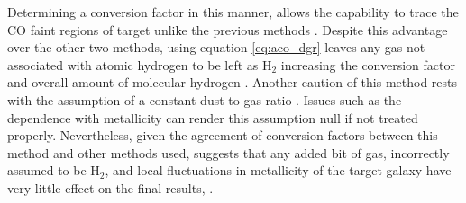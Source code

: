 Determining a conversion factor in this manner, allows the capability to trace the CO faint regions of target unlike the previous methods \citep{israel1997}.  Despite this advantage over the other two methods, using equation \ref{eq:aco_dgr} leaves any gas not associated with atomic hydrogen to be left as H$_2$ increasing the conversion factor and overall amount of molecular hydrogen \citep{bolatto2013}.  Another caution of this method rests with the assumption of a constant dust-to-gas ratio \citep{bolatto2013}.  Issues such as the dependence with metallicity  \citep{drain2007} can render this assumption null if not treated properly.  Nevertheless, given the agreement of conversion factors between this method and other methods used, suggests that any added bit of gas, incorrectly assumed to be H$_2$, and local fluctuations in metallicity of the target galaxy have very little effect on the final results, \citep{bolatto2013}.


